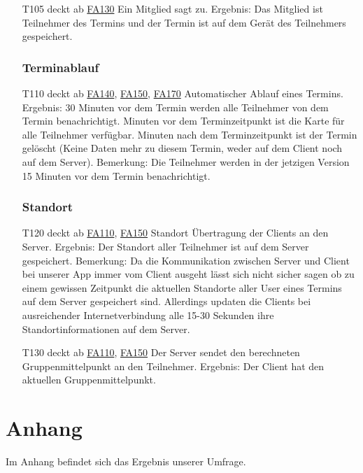 \documentclass{scrartcl}
\begin{document}
\begin{itemize}
	\item[T105] deckt ab \hyperlink{FA130}{FA130}  \newline
	Ein Mitglied sagt zu.  \newline
	Ergebnis: Das Mitglied ist Teilnehmer des Termins und der Termin ist auf dem Gerät des Teilnehmers gespeichert.
	
	\subsubsection{Terminablauf}
	
	\item[T110] deckt ab \hyperlink{FA140}{FA140}, \hyperlink{FA150}{FA150}, \hyperlink{FA170}{FA170} \newline
	Automatischer Ablauf eines Termins. \newline
	Ergebnis: 30 Minuten vor dem Termin werden alle Teilnehmer von dem Termin benachrichtigt.   Minuten vor dem Terminzeitpunkt ist die Karte für alle Teilnehmer verfügbar.   Minuten nach dem Terminzeitpunkt ist der Termin gelöscht (Keine Daten mehr zu diesem Termin, weder auf dem Client noch auf dem Server).
	Bemerkung: Die Teilnehmer werden in der jetzigen Version 15 Minuten vor dem Termin benachrichtigt. 
	
	\subsubsection{Standort}
	\item[T120] deckt ab \hyperlink{FA110}{FA110}, \hyperlink{FA150}{FA150} \newline
	Standort Übertragung der Clients an den Server.  \newline
	Ergebnis: Der Standort aller Teilnehmer ist auf dem Server gespeichert. \newline
	Bemerkung: Da die Kommunikation zwischen Server und Client bei unserer App immer vom Client ausgeht lässt sich nicht sicher sagen ob zu einem gewissen Zeitpunkt die aktuellen Standorte aller User eines Termins auf dem Server gespeichert sind. Allerdings updaten die Clients bei ausreichender Internetverbindung alle 15-30 Sekunden ihre Standortinformationen auf dem Server.
	
	\item[T130]  deckt ab \hyperlink{FA110}{FA110}, \hyperlink{FA150}{FA150} \newline
	Der Server sendet den berechneten Gruppenmittelpunkt an den Teilnehmer. \newline
	Ergebnis: Der Client hat den aktuellen Gruppenmittelpunkt.
	
\end{itemize}	

\newpage
\section{Anhang}
Im Anhang befindet sich das Ergebnis unserer Umfrage.

\end{document}
